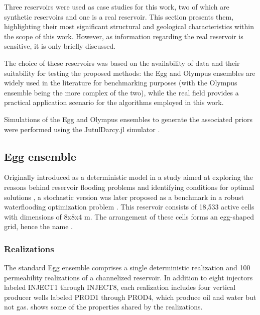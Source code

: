 Three reservoirs were used as case studies for this work, two of which are synthetic reservoirs and one is a real reservoir. 
This section presents them, highlighting their most significant structural and geological characteristics within the scope of this work. 
However, as information regarding the real reservoir is sensitive, it is only briefly discussed.

The choice of these reservoirs was based on the availability of data and their suitability for testing the proposed methods:
the Egg and Olympus ensembles are widely used in the literature for benchmarking purposes (with the Olympus ensemble being the more complex of the two),
while the real field provides a practical application scenario for the algorithms employed in this work.

Simulations of the Egg and Olympus ensembles to generate the associated priors 
were performed using the JutulDarcy.jl simulator \cite{Moyner:2025}.

\subsection{Egg ensemble}
Originally introduced as a deterministic model in a study aimed at 
exploring the reasons behind reservoir flooding problems and identifying conditions for optimal solutions 
\cite{Zandvliet:2007}, 
a stochastic version was later proposed as a benchmark in a robust waterflooding optimization problem \cite{Essen:2009}. 
This reservoir consists of 18,533 active cells with dimensions of 8x8x4 m. 
The arrangement of these cells forms an egg-shaped grid, hence the name \cite{Jansen:2014}.

    \subsubsection{Realizations}
    The standard Egg ensemble comprises a single deterministic realization and 100 permeability realizations of a channelized reservoir. 
    In addition to eight injectors labeled INJECT1 through INJECT8, 
    each realization includes four vertical producer wells labeled PROD1 through PROD4, 
    which produce oil and water but not  gas. 
     shows some of the properties shared by the realizations.
        
    \begin{table}[htbp]
    \end{table}  

